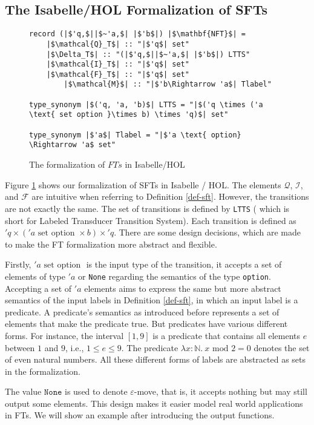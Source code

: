 \documentclass[a4paper,UKenglish,cleveref, autoref, thm-restate]{lipics-v2021}
\begin{document}
\subsection{The Isabelle/HOL Formalization of SFTs}

\begin{figure}[hbt!]
	\begin{lstlisting}
record (|$'q,$||$~'a,$| |$'b$|) |$\mathbf{NFT}$| =
	|$\mathcal{Q}_T$| :: "|$'q$| set"
	|$\Delta_T$| :: "(|$'q,$||$~'a,$| |$'b$|) LTTS"
	|$\mathcal{I}_T$| :: "|$'q$| set"
	|$\mathcal{F}_T$| :: "|$'q$| set"
        |$\mathcal{M}$| :: "|$'b\Rightarrow 'a$| Tlabel"
        
type_synonym |$('q, 'a, 'b)$| LTTS = "|$('q \times ('a \text{ set option }\times b) \times 'q)$| set"

type_synonym |$'a$| Tlabel = "|$'a \text{ option} \Rightarrow 'a$ set"
	\end{lstlisting}
\caption{The formalization of $FTs$ in Isabelle/HOL}
\label{fig-def-FT}
\end{figure}

Figure \ref{fig-def-FT} shows our formalization of SFTs in Isabelle / HOL. The elements $\mathcal{Q}$, $\mathcal{I}$, and $\mathcal{F}$ are intuitive when referring to Definition \ref{def-sft}. However, the transitions are not exactly the same. 
%
The set of transitions is defined by \texttt{LTTS} ( which is short for Labeled Transducer Transition System). Each transition is defined as $'q \times ('a \text{ set option }\times b) \times 'q$. There are some design decisions, which are made to make the FT formalization more abstract and flexible.

Firstly, $'a \text{ set option }$ is the input type of the transition, it accepts a set of elements of type $'a$ or \texttt{None} regarding the semantics of the type \texttt{option}. 
Accepting a set of $'a$ elements aims to express the same but more abstract semantics of the input labels in Definition \ref{def-sft}, in which an input label is a predicate. A predicate's semantics as introduced before represents a set of elements that make the predicate true. But predicates have various different forms. For instance, the interval $[1, 9]$ is a predicate that contains all elements $e$ between $1$ and $9$, i.e., $1 \leq e \leq 9$. The predicate $\lambda x : \mathbb{N}.~ x \text{ mod } 2 = 0$ denotes the set of even natural numbers. All these different forms of labels are abstracted as sets in the formalization.

%
The value $\texttt{None}$ is used to denote $\varepsilon$-move, that is, it accepts nothing but may still output some elements. This design makes it easier model real world applications in FTs. We will show an example after introducing the output functions. 
\end{document}
